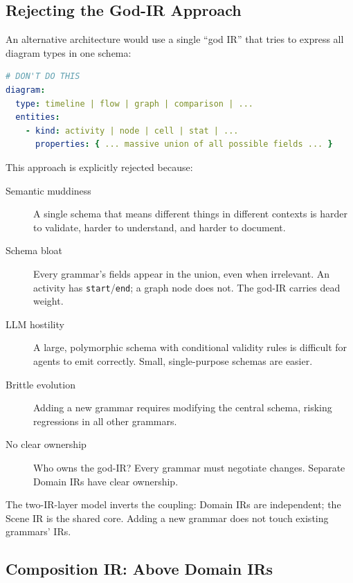 \subsection{Rejecting the God-IR Approach}

An alternative architecture would use a single ``god IR'' that tries to express all diagram types in one schema:

\begin{lstlisting}[language=yaml,caption={Hypothetical god-IR (rejected)}]
# DON'T DO THIS
diagram:
  type: timeline | flow | graph | comparison | ...
  entities:
    - kind: activity | node | cell | stat | ...
      properties: { ... massive union of all possible fields ... }
\end{lstlisting}

This approach is explicitly rejected because:

\begin{description}
  \item[Semantic muddiness] A single schema that means different things in different contexts is harder to validate, harder to understand, and harder to document.
  
  \item[Schema bloat] Every grammar's fields appear in the union, even when irrelevant. An activity has \texttt{start}/\texttt{end}; a graph node does not. The god-IR carries dead weight.
  
  \item[LLM hostility] A large, polymorphic schema with conditional validity rules is difficult for agents to emit correctly. Small, single-purpose schemas are easier.
  
  \item[Brittle evolution] Adding a new grammar requires modifying the central schema, risking regressions in all other grammars.
  
  \item[No clear ownership] Who owns the god-IR? Every grammar must negotiate changes. Separate Domain IRs have clear ownership.
\end{description}

The two-IR-layer model inverts the coupling: Domain IRs are independent; the Scene IR is the shared core. Adding a new grammar does not touch existing grammars' IRs.

\subsection{Composition IR: Above Domain IRs}

